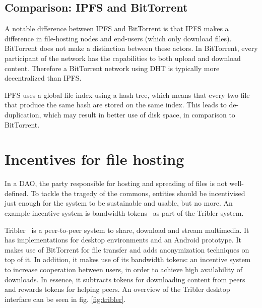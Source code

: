 \subsection{Comparison: IPFS and BitTorrent}
A notable difference between IPFS and BitTorrent is that IPFS makes a difference in file-hosting nodes and end-users (which only download files). BitTorrent does not make a distinction between these actors. In BitTorrent, every participant of the network has the capabilities to both upload and download content. Therefore a BitTorrent network using DHT is typically more decentralized than IPFS. 

IPFS uses a global file index using a hash tree, which means that every two file that produce the same hash are stored on the same index. This leads to de-duplication, which may result in better use of disk space, in comparison to BitTorrent.


\section{Incentives for file hosting}
\label{sec:file-spreading-incentives}
In a DAO, the party responsible for hosting and spreading of files is not well-defined. To tackle the tragedy of the commons, entities should be incentivised just enough for the system to be sustainable and usable, but no more. An example incentive system is bandwidth tokens~\citep{de2018blockchain} as part of the Tribler system.

Tribler~\citep{pouwelse2008tribler} is a peer-to-peer system to share, download and stream multimedia. It has implementations for desktop environments and an Android prototype. It makes use of BitTorrent for file transfer and adds anonymization techniques on top of it. In addition, it makes use of its bandwidth tokens: an incentive system to increase cooperation between users, in order to achieve high availability of downloads. In essence, it subtracts tokens for downloading content from peers and rewards tokens for helping peers. An overview of the Tribler desktop interface can be seen in fig. \ref{fig:tribler}.



